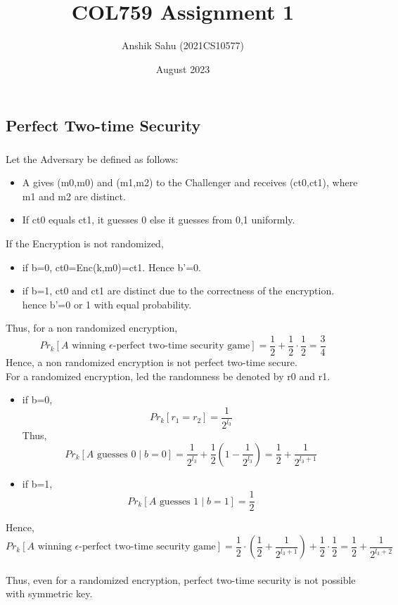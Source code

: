 \documentclass{article}
\title{\textbf{COL759 Assignment 1}}
\author{Anshik Sahu (2021CS10577)}
\date{August 2023}
\begin{document}
\maketitle
\section{}
\subsection{Perfect Two-time Security}
\subsubsection{}
Let the Adversary be defined as follows:
\begin{itemize}
    \item A gives (m0,m0) and (m1,m2) to the Challenger and receives (ct0,ct1), where m1 and m2 are distinct.
    \item If ct0 equals ct1, it guesses 0 else it guesses from {0,1} uniformly.
\end{itemize}
If the Encryption is not randomized,
\begin{itemize}
    \item if b=0, ct0=Enc(k,m0)=ct1. Hence b'=0.
    \item if b=1, ct0 and ct1 are distinct due to the correctness of the encryption. hence b'=0 or 1 with equal probability.
\end{itemize}
Thus, for a non randomized encryption,
\[Pr_{k}[A \text{ winning } \epsilon \text{-perfect two-time security game}] = \frac{1}{2} + \frac{1}{2} \cdot \frac{1}{2} = \frac{3}{4}
\]
Hence, a non randomized encryption is not perfect two-time secure.\\
For a randomized encryption, led the randomness be denoted by r0 and r1.
\begin{itemize}
    \item if b=0, 
    \[ Pr_{k}[r_1 = r_2] = \frac{1}{2^{l_3}} \]
    Thus,
    \[Pr_{k}[A \text{ guesses } 0 \mid b = 0] = \frac{1}{2^{l_3}} + \frac{1}{2} \left(1 - \frac{1}{2^{l_3}}\right) = \frac{1}{2} + \frac{1}{2^{l_3+1}}\]
    \item if b=1,
    \[Pr_{k}[A \text{ guesses } 1 \mid b = 1] = \frac{1}{2}\]
\end{itemize}
Hence,
\[Pr_{k}[A \text{ winning } \epsilon \text{-perfect two-time security game}] = \frac{1}{2} \cdot \left( \frac{1}{2} + \frac{1}{2^{l_3+1}} \right) + \frac{1}{2} \cdot \frac{1}{2} = \frac{1}{2} + \frac{1}{2^{l_3+2}}\]\\
Thus, even for a randomized encryption, perfect two-time security is not possible with symmetric key.
\newpage
\end{document}
